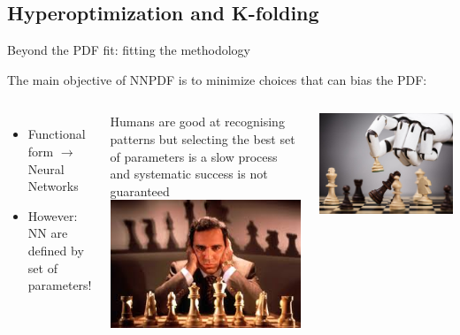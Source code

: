 \subsection{Hyperoptimization and K-folding}

\begin{frame}{Beyond the PDF fit: fitting the methodology}

    The main objective of NNPDF is to minimize choices that can bias the PDF:

    \begin{columns}
        \begin{itemize}
            \item[\rma] Functional form $\longrightarrow$ Neural Networks
            \item[\rma] However: NN are defined by set of parameters!
        \end{itemize}

        \vspace{0.2cm}

        Humans are good at recognising patterns but selecting the best
        set of parameters is a slow process and systematic success is not guaranteed
        \includegraphics[width=\textwidth]{juan_future_hyperopt/kasparov.jpg}

        \includegraphics[width=\textwidth]{juan_future_hyperopt/alphazero.jpg}
    \end{columns}


\end{frame}
